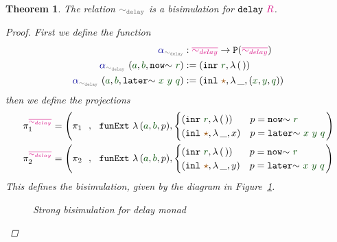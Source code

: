 \documentclass[twoside,11pt,openright]{report}
\theoremstyle{plain} %
\newtheorem{thm}{Theorem}[section]
\theoremstyle{definition}
\theoremstyle{remark}
\newcommand*{\figref}[1]{Figure~\ref{fig:#1}}
\newcommand*{\term}[1]{\textcolor{green!30!black}{#1}} %
\newcommand*{\type}[1]{\textcolor{magenta!90!black}{#1}}
\newcommand*{\coalg}[2]{#1\texttt{-}#2}
\newcommand*{\relation}[1]{\textcolor{gray}{\ensuremath{\mathtt{#1}}}}
\newcommand*{\constant}[1]{\textcolor{orange!60!black}{\ensuremath{\mathtt{#1}}}}
\newcommand*{\function}[1]{\textcolor{blue!60!black}{\ensuremath{\mathtt{#1}}}}
\newcommand*{\typeformer}[1]{\ensuremath{\mathtt{#1}}}
\newcommand*{\functor}[1]{\ensuremath{\mathbf{\mathtt{#1}}}}
\newcommand*{\unitelem}{\constant{\star}} %
\begin{document}
\begin{thm}
  The relation \(\relation{\sim_{delay}}\) is a bisimulation for \(\typeformer{delay}~\type{R}\).
  \begin{proof}
    First we define the function
    \begin{equation}
      \begin{aligned}
        \function{\alpha}_{\relation{\sim_{delay}}} &: \type{\overline{\sim_{delay}}} \rightarrow \functor{P} (\type{\overline{\sim_{delay}}}) \\
        \function{\alpha}_{\relation{\sim_{delay}}}~(\term{a} , \term{b} , \mathtt{now}{\sim}~\term{r}) &:= (\mathtt{inr}~\term{r} , \lambda\,(\,)) \\
        \function{\alpha}_{\relation{\sim_{delay}}}~(\term{a} , \term{b} , \mathtt{later}{\sim}~\term{x}~\term{y}~\term{q}) &:= (\mathtt{inl}~\unitelem , \lambda\,\_, (\term{x} , \term{y} , \term{q}))
      \end{aligned}
    \end{equation}
    then we define the projections
      \begin{align}
        \pi_1^{\type{\overline{\sim_{delay}}}} &= \left( \pi_1 ~~ , ~~ \texttt{funExt}~\lambda\,(\term{a},\term{b},p), \begin{cases} (\mathtt{inr}~\term{r} , \lambda\,(\,)) & p = \mathtt{now}{\sim}~\term{r} \\ (\mathtt{inl}~\unitelem , \lambda\,\_, x) & p = \mathtt{later}{\sim}~\term{x}~\term{y}~\term{q}\end{cases} \right) \\
        \pi_2^{\type{\overline{\sim_{delay}}}} &= \left( \pi_2 ~~ , ~~ \texttt{funExt}~\lambda\,(\term{a},\term{b},p), \begin{cases} (\mathtt{inr}~\term{r} , \lambda\,(\,)) & p = \mathtt{now}{\sim}~\term{r} \\ (\mathtt{inl}~\unitelem , \lambda\,\_, y) & p = \mathtt{later}{\sim}~\term{x}~\term{y}~\term{q}\end{cases} \right) \\
      \end{align}
      This defines the bisimulation, given by the diagram in \figref{delay-strong-bisim}.
      \begin{figure}[h]
        \centering
        \caption{Strong bisimulation for delay monad}
        \label{fig:delay-strong-bisim}
      \end{figure}
  \end{proof}
\end{thm}
\end{document}
